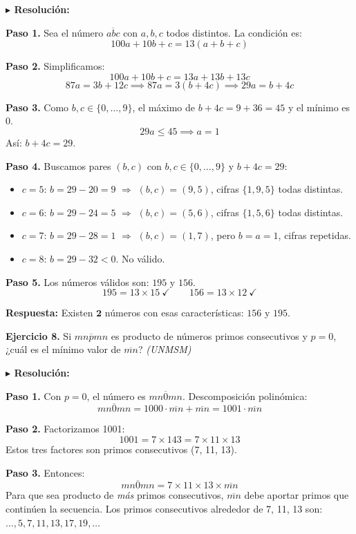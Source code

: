 \documentclass[10pt]{article}
\newcommand{\ejercicio}[2]{%
  \begin{enuncbox}
    \textbf{\textcolor{enunciado}{Ejercicio #1.}} #2
  \end{enuncbox}
}
\newcommand{\resolucion}{\vspace{2pt}\textbf{\textcolor{resolucion}{$\blacktriangleright$ Resolución:}}\vspace{4pt}}
\newcommand{\respuesta}[1]{%
  \begin{respbox}
    \textbf{\textcolor{respuesta}{Respuesta:}} #1
  \end{respbox}
}
\begin{document}
\resolucion

\textbf{Paso 1.} Sea el número $\overline{abc}$ con $a, b, c$ todos distintos. La condición es:
\[
    100a + 10b + c = 13(a + b + c)
\]

\textbf{Paso 2.} Simplificamos:
\[
    100a + 10b + c = 13a + 13b + 13c
\]
\[
    87a = 3b + 12c \implies 87a = 3(b + 4c) \implies 29a = b + 4c
\]

\textbf{Paso 3.} Como $b, c \in \{0,\ldots,9\}$, el máximo de $b + 4c = 9 + 36 = 45$ y el mínimo es $0$.
\[
    29a \leq 45 \implies a = 1
\]
Así: $b + 4c = 29$.

\textbf{Paso 4.} Buscamos pares $(b,c)$ con $b,c \in \{0,\ldots,9\}$ y $b+4c = 29$:
\begin{itemize}[itemsep=2pt]
    \item $c = 5$: $b = 29 - 20 = 9$ $\Rightarrow$ $(b,c) = (9,5)$, cifras $\{1,9,5\}$ todas distintas. \checkmark
    \item $c = 6$: $b = 29 - 24 = 5$ $\Rightarrow$ $(b,c) = (5,6)$, cifras $\{1,5,6\}$ todas distintas. \checkmark
    \item $c = 7$: $b = 29 - 28 = 1$ $\Rightarrow$ $(b,c) = (1,7)$, pero $b = a = 1$, cifras repetidas. \texttimes
    \item $c = 8$: $b = 29 - 32 < 0$. No válido.
\end{itemize}

\textbf{Paso 5.} Los números válidos son: $195$ y $156$.
\[
    195 = 13 \times 15\ \checkmark \qquad 156 = 13 \times 12\ \checkmark
\]

\respuesta{Existen $\mathbf{2}$ números con esas características: $156$ y $195$.}

\ejercicio{8}{Si $\overline{mnpmn}$ es producto de números primos consecutivos y $p = 0$, ¿cuál es el mínimo valor de $\overline{mn}$? \hfill \textit{(UNMSM)}}

\resolucion

\textbf{Paso 1.} Con $p = 0$, el número es $\overline{mn0mn}$. Descomposición polinómica:
\[
    \overline{mn0mn} = 1000 \cdot \overline{mn} + \overline{mn} = 1001 \cdot \overline{mn}
\]

\textbf{Paso 2.} Factorizamos 1001:
\[
    1001 = 7 \times 143 = 7 \times 11 \times 13
\]
Estos tres factores son primos consecutivos (7, 11, 13).

\textbf{Paso 3.} Entonces:
\[
    \overline{mn0mn} = 7 \times 11 \times 13 \times \overline{mn}
\]
Para que sea producto de \emph{más} primos consecutivos, $\overline{mn}$ debe aportar primos que continúen la secuencia. Los primos consecutivos alrededor de 7, 11, 13 son: $\ldots, 5, 7, 11, 13, 17, 19, \ldots$
\end{document}
